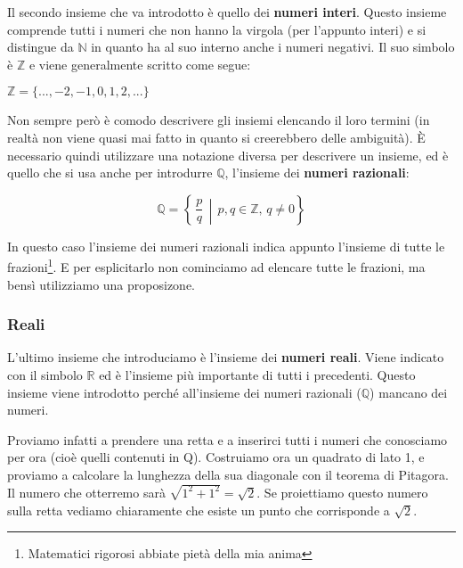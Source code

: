Il secondo insieme che va introdotto è quello dei \textbf{numeri interi}. Questo insieme comprende tutti i numeri che non hanno la virgola (per l'appunto interi) e si distingue da $\mathbb{N}$ in quanto ha al suo interno anche i numeri negativi. Il suo simbolo è $\mathbb{Z}$ e viene generalmente scritto come segue:
\begin{center}
    $\mathbb{Z} = \{..., -2, -1, 0, 1, 2, ...\}$
\end{center}

Non sempre però è comodo descrivere gli insiemi elencando il loro termini (in realtà non viene quasi mai fatto in quanto si creerebbero delle ambiguità). È necessario quindi utilizzare una notazione diversa per descrivere un insieme, ed è quello che si usa anche per introdurre $\mathbb{Q}$, l'insieme dei \textbf{numeri razionali}:
\begin{center}
    \begin{equation*}
        \mathbb{Q} = \left\{\,\dfrac{p}{q}\, \middle| \, p, q \in \mathbb{Z},\, q \neq 0 \right\}
    \end{equation*}
\end{center}
In questo caso l'insieme dei numeri razionali indica appunto l'insieme di tutte le frazioni\footnote{Matematici rigorosi abbiate pietà della mia anima}. E per esplicitarlo non cominciamo ad elencare tutte le frazioni, ma bensì utilizziamo una proposizone.

\subsubsection{Reali}
L'ultimo insieme che introduciamo è l'insieme dei \textbf{numeri reali}. Viene indicato con il simbolo $\mathbb{R}$ ed è l'insieme più importante di tutti i precedenti. Questo insieme viene introdotto perché all'insieme dei numeri razionali ($\mathbb{Q}$) mancano dei numeri.

Proviamo infatti a prendere una retta e a inserirci tutti i numeri che conosciamo per ora (cioè quelli contenuti in Q). Costruiamo ora un quadrato di lato 1, e proviamo a calcolare la lunghezza della sua diagonale con il teorema di Pitagora. Il numero che otterremo sarà $\sqrt{1^2+1^2} = \sqrt{2}$. Se proiettiamo questo numero sulla retta vediamo chiaramente che esiste un punto che corrisponde a $\sqrt{2}$.

